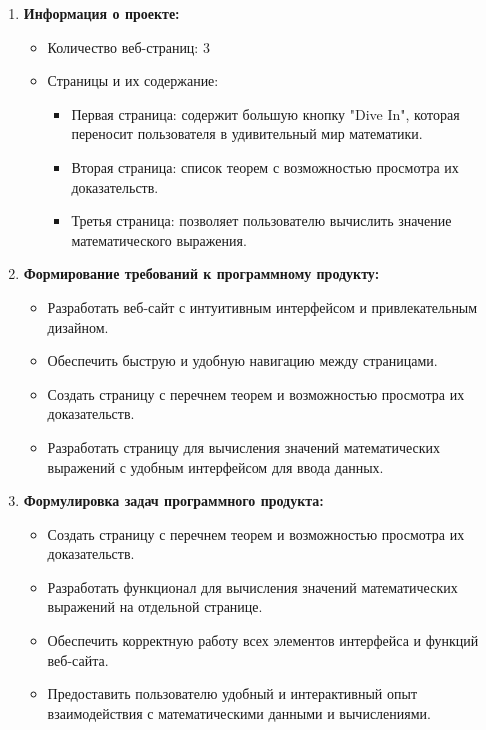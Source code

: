 \documentclass{article}
\begin{document}
    \begin{enumerate}
        \item \textbf{Информация о проекте:}
        \begin{itemize}
            \item Количество веб-страниц: 3
            \item Страницы и их содержание:
            \begin{itemize}
                \item Первая страница: содержит большую кнопку "Dive In", которая переносит пользователя в удивительный мир математики.
                \item Вторая страница: список теорем с возможностью просмотра их доказательств.
                \item Третья страница: позволяет пользователю вычислить значение математического выражения.
            \end{itemize}
        \end{itemize}
        
        \item \textbf{Формирование требований к программному продукту:}
        \begin{itemize}
            \item Разработать веб-сайт с интуитивным интерфейсом и привлекательным дизайном.
            \item Обеспечить быструю и удобную навигацию между страницами.
            \item Создать страницу с перечнем теорем и возможностью просмотра их доказательств.
            \item Разработать страницу для вычисления значений математических выражений с удобным интерфейсом для ввода данных.
        \end{itemize}
        
        \item \textbf{Формулировка задач программного продукта:}
        \begin{itemize}
            \item Создать страницу с перечнем теорем и возможностью просмотра их доказательств.
            \item Разработать функционал для вычисления значений математических выражений на отдельной странице.
            \item Обеспечить корректную работу всех элементов интерфейса и функций веб-сайта.
            \item Предоставить пользователю удобный и интерактивный опыт взаимодействия с математическими данными и вычислениями.
        \end{itemize}
    \end{enumerate}
    
\end{document}
